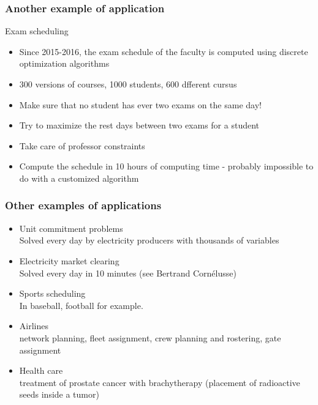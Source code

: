 \documentclass[9pt,handout]{beamer}
\begin{document}
\begin{frame}
\frametitle{Another example of application}
\begin{block}{Exam scheduling}
\begin{itemize}
\item Since 2015-2016, the exam schedule of the faculty is computed using discrete optimization algorithms\medskip
\item 300 versions of courses, 1000 students, 600 dfferent cursus\medskip
\item Make sure that \alert{no student has ever two exams on the same day}! \medskip
\item  Try to \alert{maximize the rest days} between two exams for a student\medskip
\item Take care of \alert{professor constraints}\medskip
\item Compute the schedule in 10 hours of computing time - probably impossible to do with a customized algorithm
\end{itemize}
\end{block}
\end{frame}
\begin{frame}
\frametitle{Other examples of applications}
\begin{itemize}
\item \alert{Unit commitment problems}\\
Solved every day  by electricity producers with thousands of variables\medskip
\item \alert{Electricity market clearing}\\
Solved every day in 10 minutes (see Bertrand Corn\'elusse)\medskip
\item \alert{Sports scheduling}\\
In 
baseball, football for example.\medskip
\item \alert{Airlines}\\
network planning, fleet assignment, crew planning and rostering, gate assignment\medskip
\item \alert{Health care}\\
treatment of prostate cancer with brachytherapy (placement of radioactive seeds inside a tumor) 
\end{itemize}
\end{frame}
\end{document}
